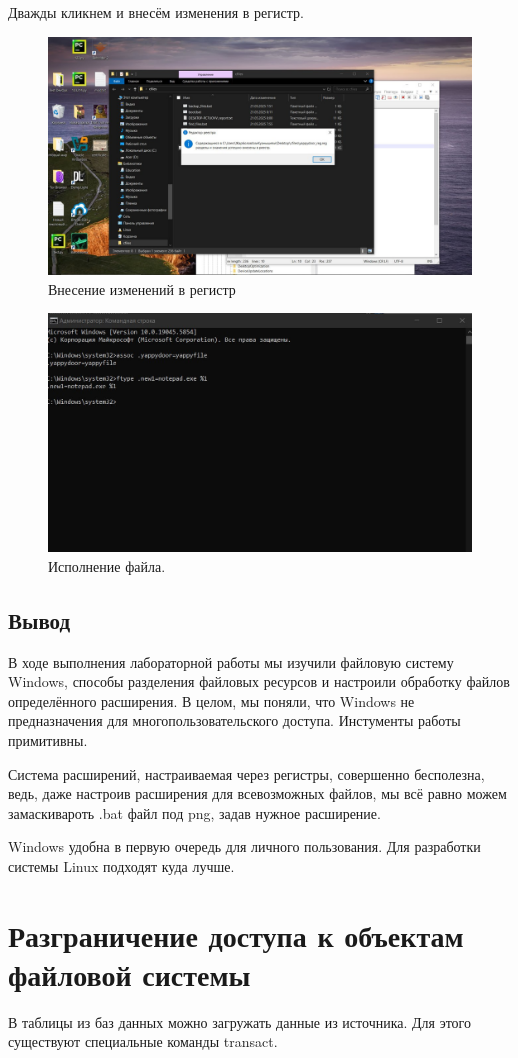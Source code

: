 Дважды кликнем и внесём изменения в регистр.

\begin{figure}[h!]
    \centering
    \includegraphics[width=0.5\linewidth]{Pic/lab2/photo_2025-05-22_00-26-24.jpg}
    \caption{Внесение изменений в регистр}
    \label{fig:REGChange}
\end{figure}

\begin{figure}[h!]
    \centering
    \includegraphics[width=0.5\linewidth]{Pic/lab2/photo_2025-05-22_00-26-29.jpg}
    \caption{Исполнение файла.}
    \label{fig:new_extend}
\end{figure}

\subsection{Вывод}

В ходе выполнения лабораторной работы мы изучили файловую систему Windows, способы разделения файловых ресурсов и настроили обработку файлов определённого расширения. В целом, мы поняли, что Windows не предназначения для многопользовательского доступа. Инстументы работы примитивны. 

Система расширений, настраиваемая через регистры, совершенно бесполезна, ведь, даже настроив расширения для всевозможных файлов, мы всё равно можем замаскивароть .bat файл под png, задав нужное расширение. 

Windows удобна в первую очередь для личного пользования. Для разработки системы Linux подходят куда лучше. 

\newpage
\section{Разграничение доступа к объектам файловой системы}
В таблицы из баз данных можно загружать данные из источника. Для этого существуют специальные команды transact.
\label{LAB3}
